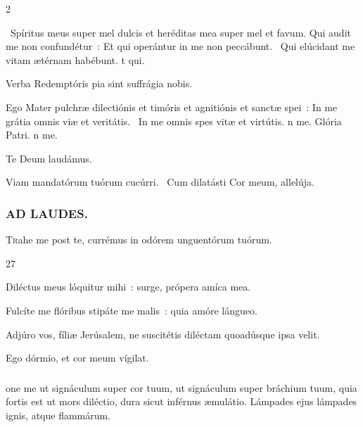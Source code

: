 \documentclass[9pt,twoside]{extarticle}
\begin{document}
\begin{multicols}{2}
\begin{tightlist}{}
\item {}~Spíritus meus super mel dulcis et heréditas mea super mel et favum. Qui audit me non confundétur~: \textred{*} Et qui operántur in me non peccábunt. ~Qui elúcidant me vitam ætérnam habébunt. t qui.
\item {} Verba Redemptóris pia sint suffrágia nobis.
\item {} Ego Mater pulchræ dilectiónis et timóris et agnitiónis et sanctæ spei~: \textred{*} In me grátia omnis viæ et veritátis. ~In me omnis spes vitæ et virtútis. n me. Glória Patri. n me.
\item Te Deum laudámus.
\item {} Viam mandatórum tuórum cucúrri. ~Cum dilatásti Cor meum, allelúja.
\end{tightlist}

\subsubsection*{\center \textsc{AD LAUDES.}}
\begin{center}\end{center}
\lettrine{T}rahe me post te, currémus in odórem unguentórum tuórum.

\begin{tightlist}{}
\item {} 27
\item {} Diléctus meus lóquitur mihi~: surge, própera amíca mea.
\item {} Fulcíte me flóribus stipáte me malis~: quia amóre lángueo.
\item {} Adjúro vos, fíliæ Jerúsalem, ne suscitétis diléctam quoadúsque ipsa velit.
\item {} Ego dórmio, et cor meum vígilat.
\end{tightlist}

\subsubsection*{}
one me ut signáculum super cor tuum, ut signáculum super bráchium tuum, quia fortis est ut mors diléctio, dura sicut inférnus æmulátio. Lámpades ejus lámpades ignis, atque flammárum.


\end{multicols}
\end{document}
